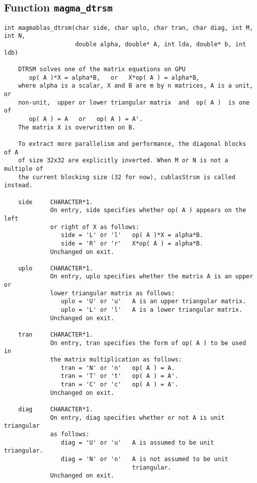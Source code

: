 \documentclass[10pt]{book}
\begin{document}
\subsection{Function {\tt {\bf magma\_dtrsm}}}
\begin{verbatim}
int magmablas_dtrsm(char side, char uplo, char tran, char diag, int M, int N, 
                    double alpha, double* A, int lda, double* b, int ldb)

    DTRSM solves one of the matrix equations on GPU  
       op( A )*X = alpha*B,   or   X*op( A ) = alpha*B,
    where alpha is a scalar, X and B are m by n matrices, A is a unit, or
    non-unit,  upper or lower triangular matrix  and  op( A )  is one  of 
       op( A ) = A   or   op( A ) = A'.  
    The matrix X is overwritten on B.

    To extract more parallelism and performance, the diagonal blocks of A 
    of size 32x32 are explicitly inverted. When M or N is not a multiple of 
    the current blocking size (32 for now), cublasStrsm is called instead. 

    side     CHARACTER*1.
             On entry, side specifies whether op( A ) appears on the left
             or right of X as follows:
                side = 'L' or 'l'   op( A )*X = alpha*B.  
                side = 'R' or 'r'   X*op( A ) = alpha*B.  
             Unchanged on exit.
   
    uplo     CHARACTER*1.
             On entry, uplo specifies whether the matrix A is an upper or
             lower triangular matrix as follows:
                uplo = 'U' or 'u'   A is an upper triangular matrix.  
                uplo = 'L' or 'l'   A is a lower triangular matrix.  
             Unchanged on exit.
   
    tran     CHARACTER*1.
             On entry, tran specifies the form of op( A ) to be used in
             the matrix multiplication as follows:
                tran = 'N' or 'n'   op( A ) = A.
                tran = 'T' or 't'   op( A ) = A'.
                tran = 'C' or 'c'   op( A ) = A'.
             Unchanged on exit.
  
    diag     CHARACTER*1.
             On entry, diag specifies whether or not A is unit triangular
             as follows:
                diag = 'U' or 'u'   A is assumed to be unit triangular.  
                diag = 'N' or 'n'   A is not assumed to be unit
                                    triangular.  
             Unchanged on exit.
	   

\end{verbatim}
\end{document}
